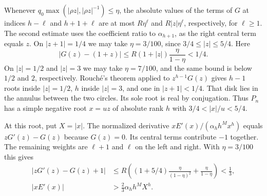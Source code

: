 Whenever $q_0\max(|\rho z|,|\rho z|^{-1})\le\eta$, the absolute values
of the terms of $G$ at indices $h-\ell$ and $h+1+\ell$ are at most
$R\eta^\ell$ and $R|z|\eta^\ell$, respectively, for $\ell\ge1$.
The second estimate uses the coefficient ratio to $\alpha_{h+1}$,
as the right central term equals $z$.
On $|z+1|=1/4$ we may take $\eta=3/100$, since
$3/4\le |z|\le5/4$. Here
\[
 |G(z)-(1+z)|\le R(1+|z|)\frac{\eta}{1-\eta}<1/4.
\]
On $|z|=1/2$ and $|z|=3$ we may take $\eta=7/100$, and the same
bound is below $1/2$ and $2$, respectively. Rouch\'e's theorem
applied to $z^{h-1}G(z)$ gives $h-1$ roots inside $|z|=1/2$, $h$
inside $|z|=3$, and one in $|z+1|<1/4$. That disk lies in the
annulus between the two circles. Its sole root is real by
conjugation. Thus $P_n$ has a simple negative root $x=uz$ of absolute
rank $h$ with $3/4<|x|/u<5/4$.

At this root, put $X=|x|$. The normalized derivative
$xE'(x)/(\alpha_h h^M x^h)$ equals $zG'(z)-G(z)$ because
$G(z)=0$. Its central terms contribute $-1$ together. The remaining
weights are $\ell+1$ and $\ell$ on the left and right. With
$\eta=3/100$ this gives
\begin{equation}
 \begin{split}
 \bigl|zG'(z)-G(z)+1\bigr|
 &\le R\left((1+5/4)\frac{\eta}{(1-\eta)^2}
                    +\frac{\eta}{1-\eta}\right)<\frac13,\\
 |xE'(x)|&>\frac23\alpha_h h^M X^h .
 \end{split}
 \label{eq:two-cycle-front-derivative}
\end{equation}

